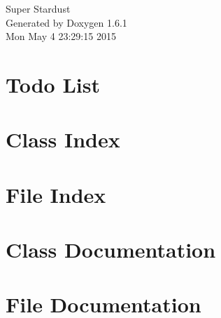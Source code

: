 \documentclass[a4paper]{book}
\begin{document}
\hypersetup{pageanchor=false}
\begin{titlepage}
\vspace*{7cm}
\begin{center}
{\Large Super Stardust }\\
\vspace*{1cm}
{\large Generated by Doxygen 1.6.1}\\
\vspace*{0.5cm}
{\small Mon May 4 23:29:15 2015}\\
\end{center}
\end{titlepage}
\clearemptydoublepage
{}
\tableofcontents
\clearemptydoublepage
{}
\hypersetup{pageanchor=true}
\chapter{Todo List}
\label{todo}
\hypertarget{todo}{}

\chapter{Class Index}

\chapter{File Index}

\chapter{Class Documentation}













\chapter{File Documentation}
































\printindex
\end{document}
